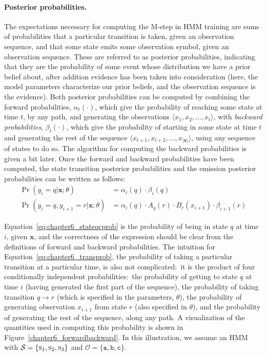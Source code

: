 \paragraph{\textbf{Posterior probabilities.}}

The expectations necessary for computing the M-step in HMM training
are sums of probabilities that a particular transition is taken, given
an observation sequence, and that some state emits some observation
symbol, given an observation sequence.  These are referred to as
posterior probabilities, indicating that they are the probability of
some event whose distribution we have a prior belief about, after
addition evidence has been taken into consideration (here, the model
parameters characterize our prior beliefs, and the observation
sequence is the evidence).  Both posterior probabilities can be
computed by combining the forward probabilities, $\alpha_t(\cdot)$,
which give the probability of reaching some state at time $t$, by any
path, and generating the observations $\langle x_1, x_2, \ldots , x_t
\rangle$, with \emph{backward probabilities}, $\beta_t(\cdot)$, which
give the probability of starting in some state at time $t$ and
generating the rest of the sequence $\langle x_{t+1}, x_{t+2}, \ldots
, x_{|\textbf{x}|} \rangle$, using any sequence of states to do so.
The algorithm for computing the backward probabilities is given a bit
later.  Once the forward and backward probabilities have been
computed, the state transition posterior probabilities and the
emission posterior probabilities can be written as follows:
\begin{align}
\label{eq:chapter6_stateocprob} \Pr(y_i = q | \textbf{x}; \theta) & = \alpha_i(q) \cdot \beta_i(q) \\
\Pr(y_i = q , y_{i+1} = r | \textbf{x}; \theta) & = \alpha_i(q) \cdot A_q(r) \cdot B_r(x_{i+1}) \cdot \beta_{i+1}(r) \label{eq:chapter6_transprob}
\end{align}

\noindent Equation~\ref{eq:chapter6_stateocprob} is the probability of
being in state $q$ at time $i$, given $\textbf{x}$, and the
correctness of the expression should be clear from the definitions of
forward and backward probabilities.  The intuition for
Equation~\ref{eq:chapter6_transprob}, the probability of taking a
particular transition at a particular time, is also not
complicated:\ it is the product of four conditionally independent
probabilities:\ the probability of getting to state $q$ at time $i$
(having generated the first part of the sequence), the probability of
taking transition $q \rightarrow r$ (which is specified in the
parameters, $\theta$), the probability of generating observation
$x_{i+1}$ from state $r$ (also specified in $\theta$), and the
probability of generating the rest of the sequence, along any path.  A
visualization of the quantities used in computing this probability is
shown in Figure~\ref{chapter6_forwardbackward}.  In this illustration,
we assume an HMM with $\mathcal{S} = \{ \textsc{s}_1, \textsc{s}_2,
\textsc{s}_3 \}$ and $\mathcal{O}=\{\texttt{a}, \texttt{b}, \texttt{c}
\}$.

